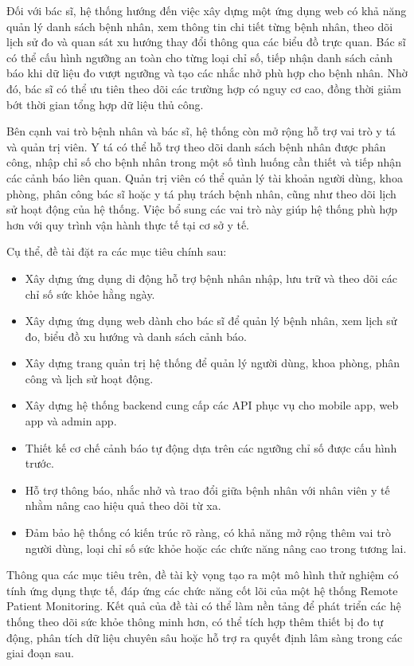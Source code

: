 Đối với bác sĩ, hệ thống hướng đến việc xây dựng một ứng dụng web có khả năng quản lý danh sách bệnh nhân, xem thông tin chi tiết từng bệnh nhân, theo dõi lịch sử đo và quan sát xu hướng thay đổi thông qua các biểu đồ trực quan. Bác sĩ có thể cấu hình ngưỡng an toàn cho từng loại chỉ số, tiếp nhận danh sách cảnh báo khi dữ liệu đo vượt ngưỡng và tạo các nhắc nhở phù hợp cho bệnh nhân. Nhờ đó, bác sĩ có thể ưu tiên theo dõi các trường hợp có nguy cơ cao, đồng thời giảm bớt thời gian tổng hợp dữ liệu thủ công.

Bên cạnh vai trò bệnh nhân và bác sĩ, hệ thống còn mở rộng hỗ trợ vai trò y tá và quản trị viên. Y tá có thể hỗ trợ theo dõi danh sách bệnh nhân được phân công, nhập chỉ số cho bệnh nhân trong một số tình huống cần thiết và tiếp nhận các cảnh báo liên quan. Quản trị viên có thể quản lý tài khoản người dùng, khoa phòng, phân công bác sĩ hoặc y tá phụ trách bệnh nhân, cũng như theo dõi lịch sử hoạt động của hệ thống. Việc bổ sung các vai trò này giúp hệ thống phù hợp hơn với quy trình vận hành thực tế tại cơ sở y tế.

Cụ thể, đề tài đặt ra các mục tiêu chính sau:
\begin{itemize}
    \item Xây dựng ứng dụng di động hỗ trợ bệnh nhân nhập, lưu trữ và theo dõi các chỉ số sức khỏe hằng ngày.
    \item Xây dựng ứng dụng web dành cho bác sĩ để quản lý bệnh nhân, xem lịch sử đo, biểu đồ xu hướng và danh sách cảnh báo.
    \item Xây dựng trang quản trị hệ thống để quản lý người dùng, khoa phòng, phân công và lịch sử hoạt động.
    \item Xây dựng hệ thống backend cung cấp các API phục vụ cho mobile app, web app và admin app.
    \item Thiết kế cơ chế cảnh báo tự động dựa trên các ngưỡng chỉ số được cấu hình trước.
    \item Hỗ trợ thông báo, nhắc nhở và trao đổi giữa bệnh nhân với nhân viên y tế nhằm nâng cao hiệu quả theo dõi từ xa.
    \item Đảm bảo hệ thống có kiến trúc rõ ràng, có khả năng mở rộng thêm vai trò người dùng, loại chỉ số sức khỏe hoặc các chức năng nâng cao trong tương lai.
\end{itemize}

Thông qua các mục tiêu trên, đề tài kỳ vọng tạo ra một mô hình thử nghiệm có tính ứng dụng thực tế, đáp ứng các chức năng cốt lõi của một hệ thống Remote Patient Monitoring. Kết quả của đề tài có thể làm nền tảng để phát triển các hệ thống theo dõi sức khỏe thông minh hơn, có thể tích hợp thêm thiết bị đo tự động, phân tích dữ liệu chuyên sâu hoặc hỗ trợ ra quyết định lâm sàng trong các giai đoạn sau.

